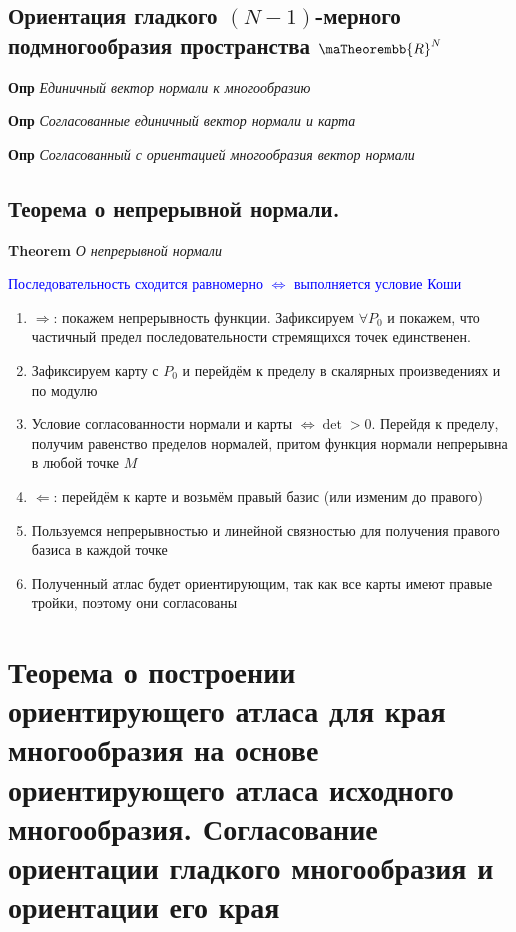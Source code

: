 \documentclass[a4paper, 14pt]{article}
\begin{document}
    \subsection{Ориентация гладкого $(N - 1)$-мерного подмногообразия пространства $\maTheorembb{R}^N$}
    
    \textbf{Опр} \textit{Единичный вектор нормали к многообразию}
    
    \textbf{Опр} \textit{Согласованные единичный вектор нормали и карта}
    
    \textbf{Опр} \textit{Согласованный с ориентацией многообразия вектор нормали}
    
    \subsection{Теорема о непрерывной нормали.}
    
    \textbf{Theorem} \textit{О непрерывной нормали}
    
    \textcolor{blue}{Последовательность сходится равномерно $\Leftrightarrow$ выполняется условие Коши}
    
    \begin{enumerate}
        \item $\Rightarrow$: покажем непрерывность функции.
        Зафиксируем $\forall P_0$ и покажем, что частичный предел последовательности стремящихся точек единственен.
        \item Зафиксируем карту с $P_0$ и перейдём к пределу в скалярных произведениях и по модулю
        \item Условие согласованности нормали и карты $\Leftrightarrow \det > 0$.
        Перейдя к пределу, получим равенство пределов нормалей, притом функция нормали непрерывна в любой точке $M$
        \item $\Leftarrow$: перейдём к карте и возьмём правый базис (или изменим до правого)
        \item Пользуемся непрерывностью и линейной связностью для получения правого базиса в каждой точке
        \item Полученный атлас будет ориентирующим, так как все карты имеют правые тройки, поэтому они согласованы
    \end{enumerate}
    
    \section{Теорема о построении ориентирующего атласа для края многообразия на основе ориентирующего атласа
    исходного многообразия.
    Согласование ориентации гладкого многообразия и ориентации его края}
    
\end{document}
